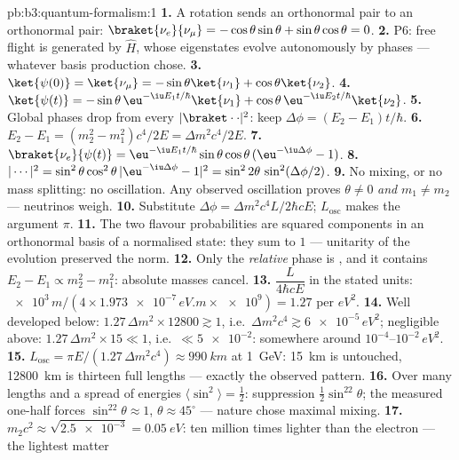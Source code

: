 \begin{solution}{pb:b3:quantum-formalism:1}
\textbf{1.} A rotation sends an orthonormal pair to an orthonormal
pair: $\braket{\nu_e}{\nu_\mu} = -\cos\theta\sin\theta +
\sin\theta\cos\theta = 0$.
\textbf{2.} P6: free flight is generated by $\hat H$, whose
eigenstates evolve autonomously by phases --- whatever basis
production chose.
\textbf{3.} $\ket{\psi(0)} = \ket{\nu_\mu} = -\sin\theta\ket{\nu_1}
+ \cos\theta\ket{\nu_2}$.
\textbf{4.} $\ket{\psi(t)} = -\sin\theta\,\eu^{-\iu E_1t/\hbar}
\ket{\nu_1} + \cos\theta\,\eu^{-\iu E_2t/\hbar}\ket{\nu_2}$.
\textbf{5.} Global phases drop from every $|\braket\cdot\cdot|^2$:
keep $\Delta\phi = (E_2 - E_1)t/\hbar$.
\textbf{6.} $E_2 - E_1 = (m_2^2 - m_1^2)c^4/2E = \Delta m^2c^4/2E$.
\textbf{7.} $\braket{\nu_e}{\psi(t)} = \eu^{-\iu E_1t/\hbar}
\sin\theta\cos\theta\,(\eu^{-\iu\Delta\phi} - 1)$.
\textbf{8.} $|\cdots|^2 = \sin^2\theta\cos^2\theta\,|{\eu^{-\iu
\Delta\phi} - 1}|^2 = \sin^22\theta\,\sin^2(\Delta\phi/2)$.
\textbf{9.} No mixing, or no mass splitting: no oscillation. Any
observed oscillation proves $\theta \neq 0$ \emph{and} $m_1 \neq
m_2$ --- neutrinos weigh.
\textbf{10.} Substitute $\Delta\phi = \Delta m^2c^4L/2\hbar cE$;
$L_{\text{osc}}$ makes the argument $\pi$.
\textbf{11.} The two flavour probabilities are squared components in
an orthonormal basis of a normalised state: they sum to $1$ ---
unitarity of the evolution preserved the norm.
\textbf{12.} Only the \emph{relative} phase is , and it
contains $E_2 - E_1 \propto m_2^2 - m_1^2$: absolute masses cancel.
\textbf{13.} $\dfrac{L}{4\hbar cE}$ in the stated units:
$\num{e3}\,\unit{m}/(4 \times \num{1.973e-7}\,\unit{eV.m} \times
\num{e9}) = 1.27$ per $\unit{eV^2}$.
\textbf{14.} Well developed below: $1.27\,\Delta m^2 \times 12800
\gtrsim 1$, i.e.\ $\Delta m^2c^4 \gtrsim \num{6e-5}\,\unit{eV^2}$;
negligible above: $1.27\,\Delta m^2 \times 15 \ll 1$, i.e.\ $\ll
\num{5e-2}$: somewhere around $10^{-4}$--$10^{-2}\,\unit{eV^2}$.
\textbf{15.} $L_{\text{osc}} = \pi E/(1.27\,\Delta m^2c^4) \approx
\qty{990}{km}$ at \qty{1}{GeV}: \qty{15}{km} is untouched,
\qty{12800}{km} is thirteen full lengths --- exactly the observed
pattern.
\textbf{16.} Over many lengths and a spread of energies
$\langle\sin^2\rangle = \tfrac12$: suppression $\tfrac12\sin^22
\theta$; the measured one-half forces $\sin^22\theta \approx 1$,
$\theta \approx 45^\circ$ --- nature chose maximal mixing.
\textbf{17.} $m_2c^2 \approx \sqrt{\num{2.5e-3}} = \qty{0.05}{eV}$:
ten million times lighter than the electron --- the lightest matter

\end{solution}
